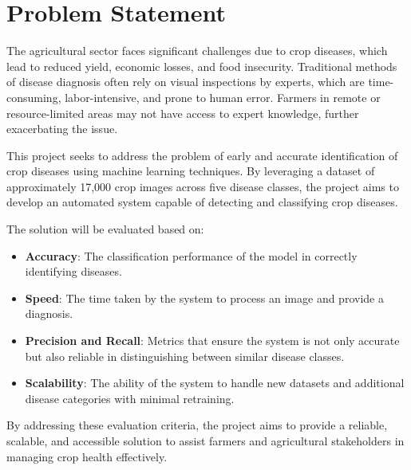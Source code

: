 \section{Problem Statement}
The agricultural sector faces significant challenges due to crop diseases, which lead to reduced yield, economic losses, and food insecurity. Traditional methods of disease diagnosis often rely on visual inspections by experts, which are time-consuming, labor-intensive, and prone to human error. Farmers in remote or resource-limited areas may not have access to expert knowledge, further exacerbating the issue.

This project seeks to address the problem of early and accurate identification of crop diseases using machine learning techniques. By leveraging a dataset of approximately 17,000 crop images across five disease classes, the project aims to develop an automated system capable of detecting and classifying crop diseases. 

The solution will be evaluated based on:
\begin{itemize}
    \item \textbf{Accuracy}: The classification performance of the model in correctly identifying diseases.
    \item \textbf{Speed}: The time taken by the system to process an image and provide a diagnosis.
    \item \textbf{Precision and Recall}: Metrics that ensure the system is not only accurate but also reliable in distinguishing between similar disease classes.
    \item \textbf{Scalability}: The ability of the system to handle new datasets and additional disease categories with minimal retraining.
\end{itemize}


By addressing these evaluation criteria, the project aims to provide a reliable, scalable, and accessible solution to assist farmers and agricultural stakeholders in managing crop health effectively.
